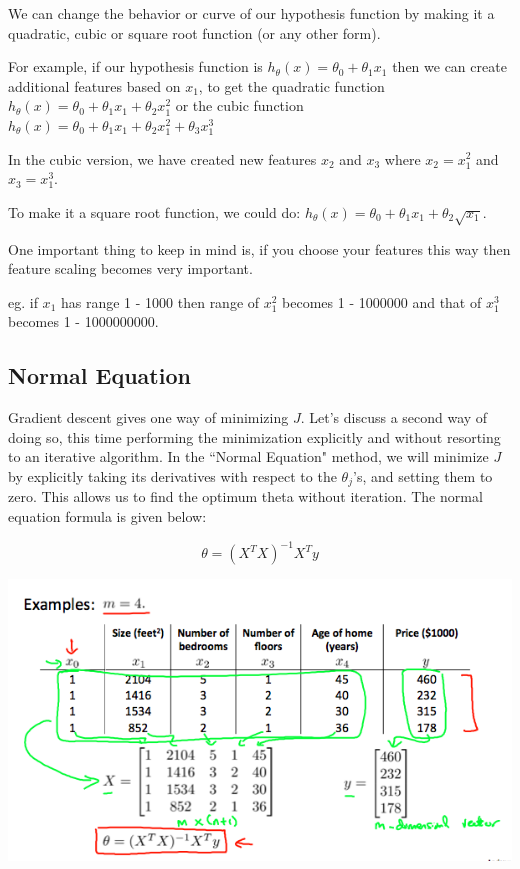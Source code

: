 \documentclass[UTF8]{article}
\begin{document}
We can change the behavior or curve of our hypothesis function by making it a quadratic, cubic or square root function (or any other form).

For example, if our hypothesis function is $h_\theta(x) = \theta_0 + \theta_1 x_1$ then we can create additional features based on $x_1$, to get the quadratic function $h_\theta(x) = \theta_0 + \theta_1 x_1 + \theta_2 x_1^2$ or the cubic function $h_\theta(x) = \theta_0 + \theta_1 x_1 + \theta_2 x_1^2 + \theta_3 x_1^3$

In the cubic version, we have created new features $x_2$ and $x_3$ where $x_2=x_1^2$ and $x_3=x_1^3$.

To make it a square root function, we could do: $h_\theta(x) = \theta_0 + \theta_1 x_1 + \theta_2 \sqrt{x_1}$.

One important thing to keep in mind is, if you choose your features this way then feature scaling becomes very important.

eg. if $x_1$ has range 1 - 1000 then range of $x_1^2$ becomes 1 - 1000000 and that of $x_1^3$ becomes 1 - 1000000000.

\subsection{Normal Equation}

Gradient descent gives one way of minimizing $J$. Let's discuss a second way of doing so, this time performing the minimization explicitly and without resorting to an iterative algorithm. In the ``Normal Equation" method, we will minimize $J$ by explicitly taking its derivatives with respect to the $\theta_j$'s, and setting them to zero. This allows us to find the optimum theta without iteration. The normal equation formula is given below:

\[ \theta = (X^T X)^{-1}X^T y \]

\includegraphics[width = .8\textwidth]{NotePics/4_4_1.png}
\end{document}
